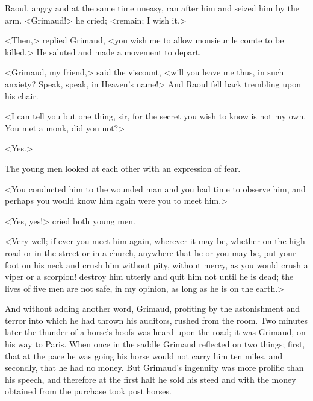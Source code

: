 Raoul, angry and at the same time uneasy, ran after him and seized him by the arm. <Grimaud!> he cried; <remain; I wish it.>

<Then,> replied Grimaud, <you wish me to allow monsieur le comte to be killed.> He saluted and made a movement to depart.

<Grimaud, my friend,> said the viscount, <will you leave me thus, in such anxiety? Speak, speak, in Heaven's name!> And Raoul fell back trembling upon his chair.

<I can tell you but one thing, sir, for the secret you wish to know is not my own. You met a monk, did you not?>

<Yes.>

The young men looked at each other with an expression of fear.

<You conducted him to the wounded man and you had time to observe him, and perhaps you would know him again were you to meet him.>

<Yes, yes!> cried both young men.

<Very well; if ever you meet him again, wherever it may be, whether on the high road or in the street or in a church, anywhere that he or you may be, put your foot on his neck and crush him without pity, without mercy, as you would crush a viper or a scorpion! destroy him utterly and quit him not until he is dead; the lives of five men are not safe, in my opinion, as long as he is on the earth.>

And without adding another word, Grimaud, profiting by the astonishment and terror into which he had thrown his auditors, rushed from the room. Two minutes later the thunder of a horse's hoofs was heard upon the road; it was Grimaud, on his way to Paris. When once in the saddle Grimaud reflected on two things; first, that at the pace he was going his horse would not carry him ten miles, and secondly, that he had no money. But Grimaud's ingenuity was more prolific than his speech, and therefore at the first halt he sold his steed and with the money obtained from the purchase took post horses. 